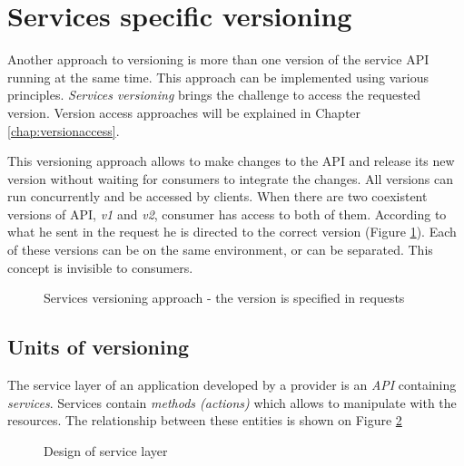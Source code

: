 \section{Services specific versioning}
Another approach to versioning is more than one version of the service API running at the same time. This approach can be implemented using various principles. \emph{Services versioning} brings the challenge to access the requested version. Version access approaches will be explained in Chapter \ref{chap:versionaccess}.


This versioning approach allows to make changes to the API and release its new version without waiting for consumers to integrate the changes. All versions can run concurrently and be accessed by clients. When there are two coexistent versions of API, \emph{v1} and \emph{v2}, consumer has access to both of them. According to what he sent in the request he is directed to the correct version (Figure \ref{fig:services-specific-versioning}). Each of these versions can be on the same environment, or can be separated. This concept is invisible to consumers.


\begin{figure}[htp] 
\caption{Services versioning approach - the version is specified in requests}
\label{fig:services-specific-versioning}
\end{figure} 


\subsection{Units of versioning}
\label{sec:units}
The service layer of an application developed by a provider is an \emph{API} containing \emph{services}. Services contain \emph{methods (actions)} which allows to manipulate with the resources. The relationship between these entities is shown on Figure \ref{fig:service-layer-design}

\begin{figure}[htp] 
\caption{Design of service layer}
\label{fig:service-layer-design}
\end{figure} 

